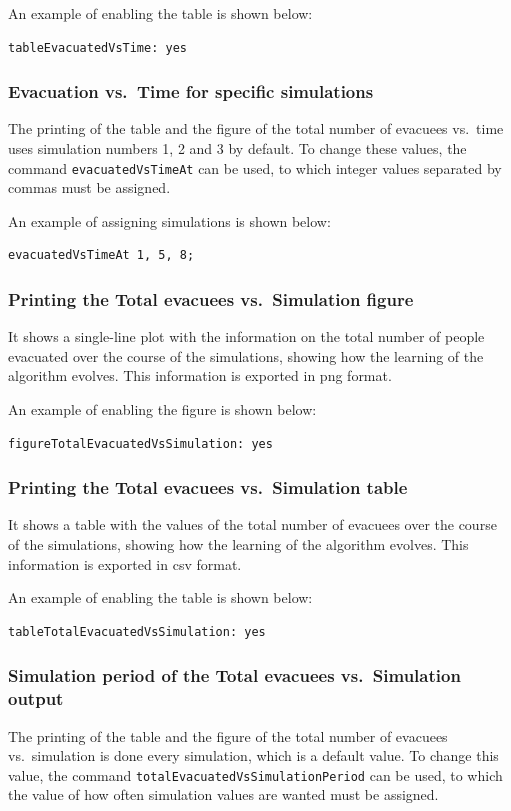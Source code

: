 \documentclass[12pt,a4paper]{book}
\begin{document}
An example of enabling the table is shown below:
\begin{lstlisting}[style=control]
tableEvacuatedVsTime: yes
\end{lstlisting}

\subsubsection*{Evacuation vs.\ Time for specific simulations}
The printing of the table and the figure of the total number of evacuees vs.\ time uses simulation
numbers 1, 2 and 3 by default. To change these values, the command
\texttt{evacuatedVsTimeAt} can be used, to which integer values separated by commas must be
assigned.

An example of assigning simulations is shown below:
\begin{lstlisting}[style=control]
  evacuatedVsTimeAt 1, 5, 8;
\end{lstlisting}

\subsubsection*{Printing the Total evacuees vs.\ Simulation figure}
It shows a single-line plot with the information on the total number of people evacuated over the
course of the simulations, showing how the learning of the algorithm evolves. This information is
exported in png format.

An example of enabling the figure is shown below:
\begin{lstlisting}[style=control]
figureTotalEvacuatedVsSimulation: yes
\end{lstlisting}

\subsubsection*{Printing the Total evacuees vs.\ Simulation table}
It shows a table with the values of the total number of evacuees over the course of the
simulations, showing how the learning of the algorithm evolves. This information is exported in
csv format.

An example of enabling the table is shown below:
\begin{lstlisting}[style=control]
  tableTotalEvacuatedVsSimulation: yes
\end{lstlisting}

\subsubsection*{Simulation period of the Total evacuees vs.\ Simulation output}
The printing of the table and the figure of the total number of evacuees vs.\ simulation is done
every simulation, which is a default value. To change this value, the command
\texttt{totalEvacuatedVsSimulationPeriod} can be used, to which the value of how often simulation
values are wanted must be assigned.
\end{document}
